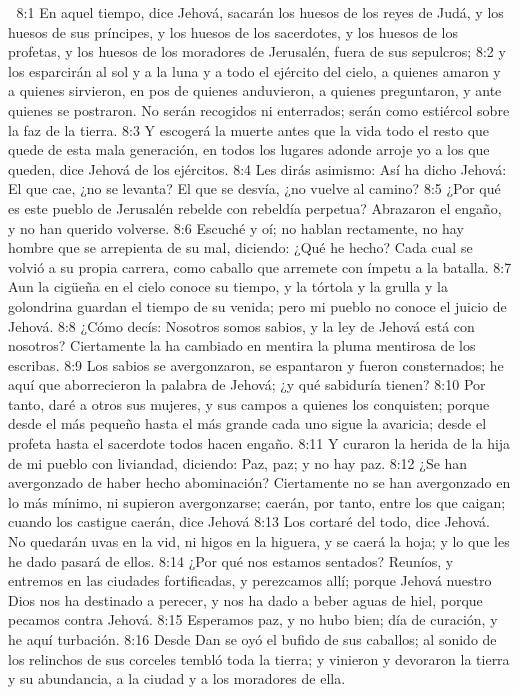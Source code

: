 
8:1 En aquel tiempo, dice Jehová, sacarán los huesos de los reyes de Judá, y los huesos de sus príncipes, y los huesos de los sacerdotes, y los huesos de los profetas, y los huesos de los moradores de Jerusalén, fuera de sus sepulcros;  
8:2 y los esparcirán al sol y a la luna y a todo el ejército del cielo, a quienes amaron y a quienes sirvieron, en pos de quienes anduvieron, a quienes preguntaron, y ante quienes se postraron. No serán recogidos ni enterrados; serán como estiércol sobre la faz de la tierra.  
8:3 Y escogerá la muerte antes que la vida todo el resto que quede de esta mala generación, en todos los lugares adonde arroje yo a los que queden, dice Jehová de los ejércitos.  
8:4 Les dirás asimismo: Así ha dicho Jehová: El que cae, ¿no se levanta? El que se desvía, ¿no vuelve al camino?  
8:5 ¿Por qué es este pueblo de Jerusalén rebelde con rebeldía perpetua? Abrazaron el engaño, y no han querido volverse.  
8:6 Escuché y oí; no hablan rectamente, no hay hombre que se arrepienta de su mal, diciendo: ¿Qué he hecho? Cada cual se volvió a su propia carrera, como caballo que arremete con ímpetu a la batalla.  
8:7 Aun la cigüeña en el cielo conoce su tiempo, y la tórtola y la grulla y la golondrina guardan el tiempo de su venida; pero mi pueblo no conoce el juicio de Jehová.  
8:8 ¿Cómo decís: Nosotros somos sabios, y la ley de Jehová está con nosotros? Ciertamente la ha cambiado en mentira la pluma mentirosa de los escribas.  
8:9 Los sabios se avergonzaron, se espantaron y fueron consternados; he aquí que aborrecieron la palabra de Jehová; ¿y qué sabiduría tienen?  
8:10 Por tanto, daré a otros sus mujeres, y sus campos a quienes los conquisten; porque desde el más pequeño hasta el más grande cada uno sigue la avaricia; desde el profeta hasta el sacerdote todos hacen engaño.  
8:11 Y curaron la herida de la hija de mi pueblo con liviandad, diciendo: Paz, paz; y no hay paz. 
8:12 ¿Se han avergonzado de haber hecho abominación? Ciertamente no se han avergonzado en lo más mínimo, ni supieron avergonzarse; caerán, por tanto, entre los que caigan; cuando los castigue caerán, dice Jehová 
8:13 Los cortaré del todo, dice Jehová. No quedarán uvas en la vid, ni higos en la higuera, y se caerá la hoja; y lo que les he dado pasará de ellos.  
8:14 ¿Por qué nos estamos sentados? Reuníos, y entremos en las ciudades fortificadas, y perezcamos allí; porque Jehová nuestro Dios nos ha destinado a perecer, y nos ha dado a beber aguas de hiel, porque pecamos contra Jehová.  
8:15 Esperamos paz, y no hubo bien; día de curación, y he aquí turbación.  
8:16 Desde Dan se oyó el bufido de sus caballos; al sonido de los relinchos de sus corceles tembló toda la tierra; y vinieron y devoraron la tierra y su abundancia, a la ciudad y a los moradores de ella.  
